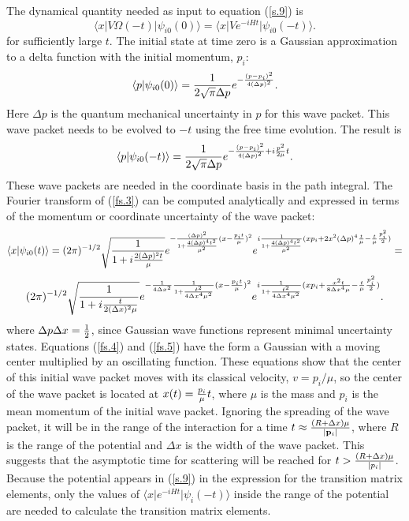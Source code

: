 \documentclass[aps,prc,reprint,noshowpacs,groupedaddress,onecolumn]{revtex4}
\def\beq{\begin{equation}}
\def\eeq{\end{equation}}
\begin{document}
The dynamical quantity needed as input to equation (\ref{s.9}) is 
\beq
\langle x \vert V \Omega (-t) \vert \psi_{i0}(0) \rangle =
\langle x \vert V
e^{-iHt} \vert
\psi_{i0} (-t) \rangle .
\label{fs.1}
\eeq
for sufficiently large $t$.  The initial state at time zero is a 
Gaussian approximation to a delta function with the initial momentum,
$p_i$:
\beq
\langle p \vert \psi_{i0}  (0) \rangle =
{1 \over 2 \sqrt{\pi} \Delta p} e^{- {(p-p_i)^2 \over 4 (\Delta p)^2}} .
\label{fs.2}
\eeq
Here $\Delta p$ is the quantum mechanical uncertainty in $p$ for this
wave packet.  This wave packet needs to be evolved to $-t$ using the 
free time evolution.  The result is
\beq
\langle p \vert \psi_{i0} (-t) \rangle =
{1 \over 2 \sqrt{\pi} \Delta p} e^{ 
- {(p-p_i)^2 \over 4 (\Delta p)^2} + i {p^2 \over 2 \mu}t}.
\label{fs.3}
\eeq
These wave packets are needed in the coordinate basis in the path 
integral.  The Fourier transform of (\ref{fs.3}) can be computed 
analytically and expressed in terms of the momentum or coordinate uncertainty
of the wave packet:
\beq
\langle x \vert \psi_{i0} (t) \rangle =
(2 \pi)^{-1/2}
\sqrt{{1  \over 1  + i {2 (\Delta p)^2 t \over  \mu}}}
e^{-
{(\Delta p)^2 \over 1  + {4 (\Delta p)^4 t^2 \over  \mu^2}}
(x-{p_it\over \mu})^2}
e^{i{1 \over 1  + {4 (\Delta p)^4 t^2 \over  \mu^2}}
(x p_i   
+ 2 x^2 (\Delta p)^4 {t \over  \mu}
- { t \over  \mu}{p_i^2 \over 2 })} =
\label{fs.4}
\eeq
\beq
(2 \pi)^{-1/2}
\sqrt{{1  \over 1  + i { t \over 2 (\Delta x)^2  \mu}}}
e^{-{1 \over 4 \Delta x^2}
{1 \over 1  + { t^2 \over 4 \Delta x^4   \mu^2}}
(x-{p_it\over \mu})^2}
e^{i{1 \over 1  + {t^2 \over 4 \Delta x^4  \mu^2}}
(x p_i   
+ { x^2 t \over  8 \Delta x^4 \mu}
- { t \over  \mu}{p_i^2 \over 2 })} .
\label{fs.5}
\eeq
where $\Delta p \Delta x = {1 \over 2}$, since Gaussian wave functions 
represent minimal uncertainty states.  Equations (\ref{fs.4})
and (\ref{fs.5}) have the
form a Gaussian with a moving center multiplied by an oscillating
function.
These equations show that the center of this
initial wave packet moves with its classical velocity, $v=p_i/\mu$, so
the center of the wave packet is located at
${x}(t) = { {p}_i \over \mu}t$, where $\mu$ is the mass and $p_i$ is
the mean momentum of the initial wave packet.  Ignoring the spreading
of the wave packet, it will be in the range of the interaction for a
time $t \approx {(R + \Delta x) \mu \over \vert \mathbf{p}_i \vert}$,
where $R$ is the range of the potential and $\Delta x$ is the width of
the wave packet.  This suggests that the asymptotic time for
scattering will be reached for
$t > {(R+ \Delta x)\mu \over \vert {p}_i\vert} $.  Because the
potential appears in (\ref{s.9}) in the expression for the transition
matrix elements, only the values of
$\langle {x} \vert e^{-iHt} \vert \psi_i(-t) \rangle$ inside the range
of the potential are needed to calculate the transition matrix
elements.
\end{document}
